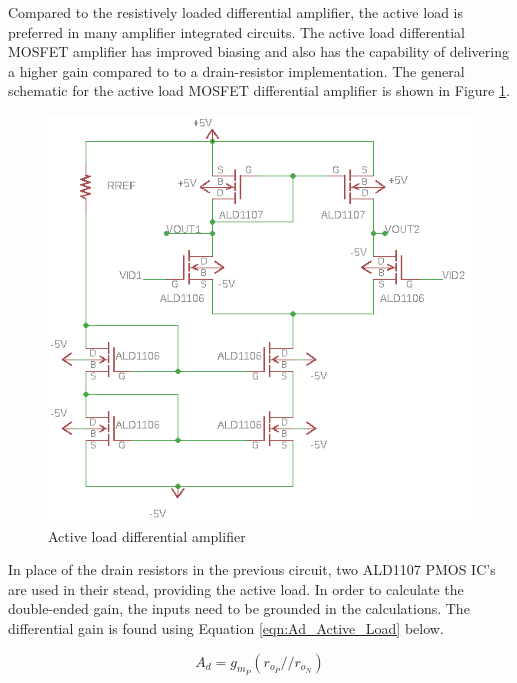 Compared to the resistively loaded differential amplifier, the active load is preferred in many amplifier integrated circuits. The active load differential MOSFET amplifier has improved biasing and also has the capability of delivering a higher gain compared to to a drain-resistor implementation. The general schematic for the active load MOSFET differential amplifier is shown in Figure \ref{fig:activeloadedgeneral}.



\begin{figure}[H]
    \begin{center}
    \includegraphics[scale=.85]{CircuitDevelopment/ActiveLoadedGeneral.png}
    \caption{Active load differential amplifier}
    \label{fig:activeloadedgeneral}
    \end{center}
    
\end{figure}

In place of the drain resistors in the previous circuit, two ALD1107 PMOS IC's are used in their stead, providing the active load. In order to calculate the double-ended gain, the inputs need to be grounded in the calculations. The differential gain is found using Equation \ref{eqn:Ad_Active_Load} below.

\begin{equation}
A_d = g_{m_P}(r_{o_P}//r_{o_N})
\label{eqn:Ad_Active_Load}
\end{equation}

